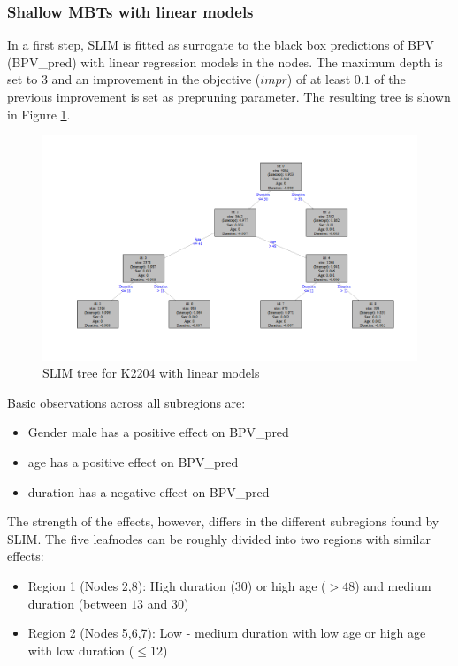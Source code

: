 \subsubsection{Shallow MBTs with linear models}
In a first step, SLIM is fitted as surrogate to the black box predictions of BPV (BPV\_pred) with linear regression models in the nodes. The maximum depth is set to 3 and an improvement in the objective ($impr$) of at least $0.1$ of the previous improvement is set as prepruning parameter.
 The resulting tree is shown in Figure \ref{fig:ins_slim_lm_tree}.

 \begin{figure}[!htb]
     \centering     
     \includegraphics[width = 14cm]{Figures/insurance_use_case/k2204_BPV/slim_lm_tree.png}
     \caption{SLIM tree for K2204 with linear models}
     \label{fig:ins_slim_lm_tree}
 \end{figure}

Basic observations across all subregions are:
\begin{itemize}
    \item Gender male has a positive effect on BPV\_pred
    \item age has a positive effect on BPV\_pred
    \item duration has a negative effect on BPV\_pred
\end{itemize}

The strength of the effects, however, differs in the different subregions found by SLIM.
The five leafnodes can be roughly divided into two regions with similar effects:
\begin{itemize}
    \item Region 1 (Nodes 2,8): High duration ($30$) or high age ($>48$) and medium duration (between $13$ and $30$)
    \item Region 2 (Nodes 5,6,7): Low - medium duration with low age or high age with low duration ($\leq 12$)
\end{itemize}

